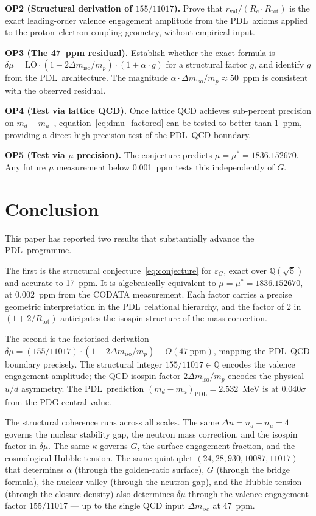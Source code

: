 \documentclass[11pt,a4paper]{article}
\theoremstyle{definition}
\newcommand{\PDL}{\textnormal{PDL}}
\newcommand{\Rtot}{R_{\mathrm{tot}}}
\newcommand{\rval}{r_{\mathrm{val}}}
\newcommand{\epsg}{\varepsilon_G}
\newcommand{\kap}{\kappa}
\newcommand{\mustar}{\mu^*}
\newcommand{\dmu}{\delta\mu}
\newcommand{\dmiso}{\Delta m_{\mathrm{iso}}}
\begin{document}
\medskip\noindent\textbf{OP2 (Structural derivation of $155/11017$).} Prove that $\rval/(R_e\cdot\Rtot)$ is the exact leading-order valence engagement amplitude from the \PDL\ axioms applied to the proton--electron coupling geometry, without empirical input.

\medskip\noindent\textbf{OP3 (The 47~ppm residual).} Establish whether the exact formula is $\dmu = \mathrm{LO}\cdot(1-2\dmiso/m_p)\cdot(1+\alpha\cdot g)$ for a structural factor $g$, and identify $g$ from the \PDL\ architecture. The magnitude $\alpha\cdot\dmiso/m_p \approx 50$~ppm is consistent with the observed residual.

\medskip\noindent\textbf{OP4 (Test via lattice QCD).} Once lattice QCD achieves sub-percent precision on $m_d - m_u$~\cite{FLAG_2024}, equation~\eqref{eq:dmu_factored} can be tested to better than 1~ppm, providing a direct high-precision test of the PDL--QCD boundary.

\medskip\noindent\textbf{OP5 (Test via $\mu$ precision).} The conjecture predicts $\mu = \mustar = 1836.152670$. Any future $\mu$ measurement below 0.001~ppm tests this independently of $G$.

\section*{Conclusion}

This paper has reported two results that substantially advance the \PDL\ programme.

The first is the structural conjecture~\eqref{eq:conjecture} for $\epsg$, exact over $\mathbb{Q}(\sqrt{5})$ and accurate to 17~ppm. It is algebraically equivalent to $\mu = \mustar = 1836.152670$, at $0.002$~ppm from the CODATA measurement. Each factor carries a precise geometric interpretation in the \PDL\ relational hierarchy, and the factor of 2 in $(1+2/\Rtot)$ anticipates the isospin structure of the mass correction.

The second is the factorised derivation $\dmu = (155/11017)\cdot(1-2\dmiso/m_p) + O(47\ \mathrm{ppm})$, mapping the PDL--QCD boundary precisely. The structural integer $155/11017 \in \mathbb{Q}$ encodes the valence engagement amplitude; the QCD isospin factor $2\dmiso/m_p$ encodes the physical $u/d$ asymmetry. The \PDL\ prediction $(m_d-m_u)_{\mathrm{PDL}} = 2.532$~MeV is at $0.040\sigma$ from the PDG central value.

The structural coherence runs across all scales. The same $\Delta n = n_d - n_u = 4$ governs the nuclear stability gap, the neutron mass correction, and the isospin factor in $\dmu$. The same $\kap$ governs $G$, the surface engagement fraction, and the cosmological Hubble tension. The same quintuplet $(24, 28, 930, 10087, 11017)$ that determines $\alpha$ (through the golden-ratio surface), $G$ (through the bridge formula), the nuclear valley (through the neutron gap), and the Hubble tension (through the closure density) also determines $\dmu$ through the valence engagement factor $155/11017$ --- up to the single QCD input $\dmiso$ at 47~ppm.
\end{document}
